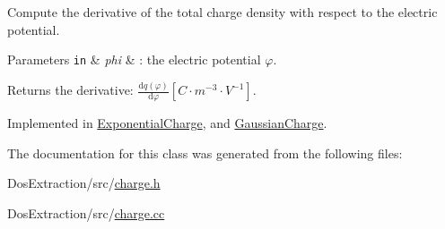 Compute the derivative of the total charge density with respect to the electric potential. 


\begin{DoxyParams}[1]{Parameters}
\mbox{\tt in}  & {\em phi} & \-: the electric potential $ \varphi $. \\
\hline
\end{DoxyParams}
\begin{DoxyReturn}{Returns}
the derivative\-: $ \frac{\mathrm{d}q(\varphi)}{\mathrm{d}\varphi} \left[ C \cdot m^{-3} \cdot V^{-1} \right] $. 
\end{DoxyReturn}


Implemented in \hyperlink{classExponentialCharge_a06f7a60ee2bce4590e2a12286aa0e9eb}{Exponential\-Charge}, and \hyperlink{classGaussianCharge_a06f7a60ee2bce4590e2a12286aa0e9eb}{Gaussian\-Charge}.



The documentation for this class was generated from the following files\-:\begin{DoxyCompactItemize}
\item 
Dos\-Extraction/src/\hyperlink{charge_8h}{charge.\-h}\item 
Dos\-Extraction/src/\hyperlink{charge_8cc}{charge.\-cc}\end{DoxyCompactItemize}

